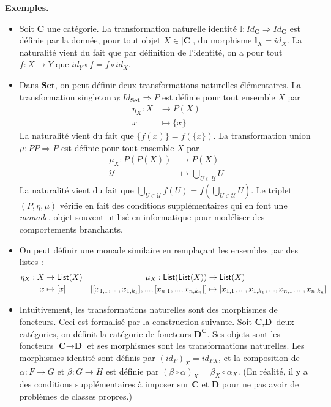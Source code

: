 \documentclass[11pt,a4paper]{article}
\newcommand{\gr}{\textbf}
\newcommand{\il}{\textit}
\newcommand{\U}{\mathcal{U}}
\newcommand{\info}[1]{\text{{\fontfamily{lmss}\selectfont #1}}}
\begin{document}
\gr{Exemples.} \begin{itemize}
\item Soit $\gr{C}$ une catégorie. La transformation naturelle identité $\mathbb{I} : Id_\gr{C} \Rightarrow Id_\gr{C}$ est définie par la donnée, pour tout objet $X \in |\gr{C}|$, du morphisme $\mathbb{I}_X = id_X$. La naturalité vient du fait que par définition de l'identité, on a pour tout $f : X \to Y$ que $id_Y \circ f = f \circ id_X$.
\item Dans $\gr{Set}$, on peut définir deux transformations naturelles élémentaires. La transformation singleton $\eta : Id_\gr{Set} \Rightarrow P$ est définie pour tout ensemble $X$ par
\begin{align*}
\eta_X : X & \to P(X) \\
x & \mapsto \{ x \}
\end{align*}
La naturalité vient du fait que $\{ f(x) \} = f(\{x\})$. La transformation union $\mu : PP \Rightarrow P$ est définie pour tout ensemble $X$ par
\begin{align*}
\mu_X : P(P(X)) & \to P(X) \\
\U & \mapsto \bigcup_{U \in \U} U
\end{align*}
La naturalité vient du fait que $\bigcup_{U\in \U} f(U) = f\left(\bigcup_{U \in \U} U\right)$. Le triplet $(P,\eta,\mu)$ vérifie en fait des conditions supplémentaires qui en font une \il{monade}, objet souvent utilisé en informatique pour modéliser des comportements branchants.
\item On peut définir une monade similaire en remplaçant les ensembles par des listes :
\begin{align*}
 \eta_X : X & \to \info{List}(X) & \mu_X : \info{List}(\info{List}(X)) & \to \info{List}(X)  \\
 x & \mapsto [x] & [[x_{1,1},...,x_{1,k_1}],...,[x_{n,1},...,x_{n,k_n}]] & \mapsto [x_{1,1},...,x_{1,k_1},...,x_{n,1},...,x_{n,k_n}]
\end{align*}
\item Intuitivement, les transformations naturelles sont des morphismes de foncteurs. Ceci est formalisé par la construction suivante. Soit $\gr{C},\gr{D}$ deux catégories, on définit la catégorie de foncteurs $\gr{D}^\gr{C}$. Ses objets sont les foncteurs $\gr{C} \to \gr{D}$ et ses morphismes sont les transformations naturelles. Les morphismes identité sont définis par $(id_F)_X = id_{FX}$, et la composition de $\alpha : F \to G$ et $\beta : G \to H$ est définie par $(\beta \circ \alpha)_X = \beta_X \circ \alpha_X$. (En réalité, il y a des conditions supplémentaires à imposer sur $\gr{C}$ et $\gr{D}$ pour ne pas avoir de problèmes de classes propres.)
\end{itemize}
\newpage
\end{document}
